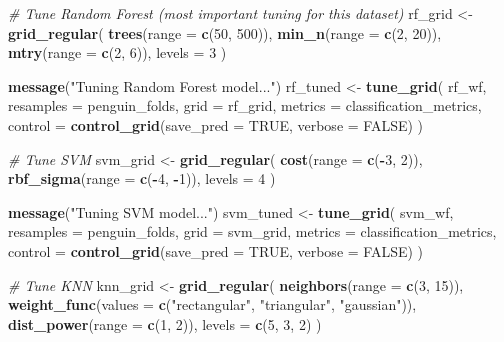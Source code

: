 \documentclass[
]{article}
\newenvironment{Shaded}{\begin{snugshade}}{\end{snugshade}}
\newcommand{\AttributeTok}[1]{\textcolor[rgb]{0.13,0.29,0.53}{#1}}
\newcommand{\CommentTok}[1]{\textcolor[rgb]{0.56,0.35,0.01}{\textit{#1}}}
\newcommand{\ConstantTok}[1]{\textcolor[rgb]{0.56,0.35,0.01}{#1}}
\newcommand{\DecValTok}[1]{\textcolor[rgb]{0.00,0.00,0.81}{#1}}
\newcommand{\FunctionTok}[1]{\textcolor[rgb]{0.13,0.29,0.53}{\textbf{#1}}}
\newcommand{\NormalTok}[1]{#1}
\newcommand{\OtherTok}[1]{\textcolor[rgb]{0.56,0.35,0.01}{#1}}
\newcommand{\SpecialCharTok}[1]{\textcolor[rgb]{0.81,0.36,0.00}{\textbf{#1}}}
\newcommand{\StringTok}[1]{\textcolor[rgb]{0.31,0.60,0.02}{#1}}
\begin{document}
\begin{Shaded}
\begin{Highlighting}[]
\CommentTok{\# Tune Random Forest (most important tuning for this dataset)}
\NormalTok{rf\_grid }\OtherTok{\textless{}{-}} \FunctionTok{grid\_regular}\NormalTok{(}
  \FunctionTok{trees}\NormalTok{(}\AttributeTok{range =} \FunctionTok{c}\NormalTok{(}\DecValTok{50}\NormalTok{, }\DecValTok{500}\NormalTok{)),}
  \FunctionTok{min\_n}\NormalTok{(}\AttributeTok{range =} \FunctionTok{c}\NormalTok{(}\DecValTok{2}\NormalTok{, }\DecValTok{20}\NormalTok{)),}
  \FunctionTok{mtry}\NormalTok{(}\AttributeTok{range =} \FunctionTok{c}\NormalTok{(}\DecValTok{2}\NormalTok{, }\DecValTok{6}\NormalTok{)),}
  \AttributeTok{levels =} \DecValTok{3}
\NormalTok{)}

\FunctionTok{message}\NormalTok{(}\StringTok{"Tuning Random Forest model..."}\NormalTok{)}
\NormalTok{rf\_tuned }\OtherTok{\textless{}{-}} \FunctionTok{tune\_grid}\NormalTok{(}
\NormalTok{  rf\_wf,}
  \AttributeTok{resamples =}\NormalTok{ penguin\_folds,}
  \AttributeTok{grid =}\NormalTok{ rf\_grid,}
  \AttributeTok{metrics =}\NormalTok{ classification\_metrics,}
  \AttributeTok{control =} \FunctionTok{control\_grid}\NormalTok{(}\AttributeTok{save\_pred =} \ConstantTok{TRUE}\NormalTok{, }\AttributeTok{verbose =} \ConstantTok{FALSE}\NormalTok{)}
\NormalTok{)}

\CommentTok{\# Tune SVM}
\NormalTok{svm\_grid }\OtherTok{\textless{}{-}} \FunctionTok{grid\_regular}\NormalTok{(}
  \FunctionTok{cost}\NormalTok{(}\AttributeTok{range =} \FunctionTok{c}\NormalTok{(}\SpecialCharTok{{-}}\DecValTok{3}\NormalTok{, }\DecValTok{2}\NormalTok{)),}
  \FunctionTok{rbf\_sigma}\NormalTok{(}\AttributeTok{range =} \FunctionTok{c}\NormalTok{(}\SpecialCharTok{{-}}\DecValTok{4}\NormalTok{, }\SpecialCharTok{{-}}\DecValTok{1}\NormalTok{)),}
  \AttributeTok{levels =} \DecValTok{4}
\NormalTok{)}

\FunctionTok{message}\NormalTok{(}\StringTok{"Tuning SVM model..."}\NormalTok{)}
\NormalTok{svm\_tuned }\OtherTok{\textless{}{-}} \FunctionTok{tune\_grid}\NormalTok{(}
\NormalTok{  svm\_wf,}
  \AttributeTok{resamples =}\NormalTok{ penguin\_folds,}
  \AttributeTok{grid =}\NormalTok{ svm\_grid,}
  \AttributeTok{metrics =}\NormalTok{ classification\_metrics,}
  \AttributeTok{control =} \FunctionTok{control\_grid}\NormalTok{(}\AttributeTok{save\_pred =} \ConstantTok{TRUE}\NormalTok{, }\AttributeTok{verbose =} \ConstantTok{FALSE}\NormalTok{)}
\NormalTok{)}

\CommentTok{\# Tune KNN}
\NormalTok{knn\_grid }\OtherTok{\textless{}{-}} \FunctionTok{grid\_regular}\NormalTok{(}
  \FunctionTok{neighbors}\NormalTok{(}\AttributeTok{range =} \FunctionTok{c}\NormalTok{(}\DecValTok{3}\NormalTok{, }\DecValTok{15}\NormalTok{)),}
  \FunctionTok{weight\_func}\NormalTok{(}\AttributeTok{values =} \FunctionTok{c}\NormalTok{(}\StringTok{"rectangular"}\NormalTok{, }\StringTok{"triangular"}\NormalTok{, }\StringTok{"gaussian"}\NormalTok{)),}
  \FunctionTok{dist\_power}\NormalTok{(}\AttributeTok{range =} \FunctionTok{c}\NormalTok{(}\DecValTok{1}\NormalTok{, }\DecValTok{2}\NormalTok{)),}
  \AttributeTok{levels =} \FunctionTok{c}\NormalTok{(}\DecValTok{5}\NormalTok{, }\DecValTok{3}\NormalTok{, }\DecValTok{2}\NormalTok{)}
\NormalTok{)}


\end{Highlighting}
\end{Shaded}
\end{document}
